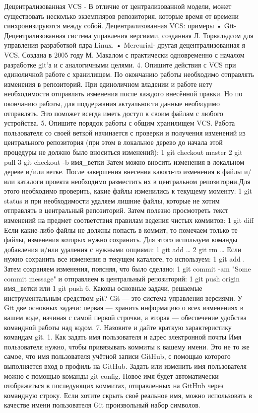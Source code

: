{{{{{{{{{{{{{{{{{{{{Децентрализованная VCS - В отличие от централизованной модели, может существовать несколько экземпляров репозитория, которые время от времени синхронизируются между собой.
Децентрализованная VCS: примеры
• Git- Децентрализованная система управления версиями, созданная Л. Торвальдсом для управления разработкой ядра Linux.
• Mercurial- другая децентрализованная я VCS. Создана в 2005 году М. Макалом с практически одновременно с началом разработке git’а и с аналогичными целями.
4. Опишите действия с VCS при единоличной работе с хранилищем.
По окончанию работы необходимо отправлять изменения в репозиторий. При единоличном владении и работе нету необходимости отправлять изменения после каждого внесённой правки. Но по окончанию работы, для поддержания актуальности данные необходимо отправлять. Это поможет всегда иметь доступ к своим файлам с любого устройства.
5. Опишите порядок работы с общим хранилищем VCS.
Работа пользователя со своей веткой начинается с проверки и получения изменений из центрального репозитория (при этом в локальное дерево до начала этой процедуры не должно было вноситься изменений):
1 git checkout master
2 git pull
3 git checkout -b имя_ветки
Затем можно вносить изменения в локальном дереве и/или ветке.
После завершения внесения какого-то изменения в файлы и/или каталоги проекта необходимо разместить их в центральном репозитории.Для этого необходимо проверить, какие файлы изменились к текущему моменту:
1 git status
и при необходимости удаляем лишние файлы, которые не хотим отправлять в центральный репозиторий.
Затем полезно просмотреть текст изменений на предмет соответствия правилам ведения чистых коммитов:
1 git diff
Если какие-либо файлы не должны попасть в коммит, то помечаем только те файлы, изменения которых нужно сохранить. Для этого используем команды добавления и/или удаления с нужными опциями:
1 git add …
2 git rm …
Если нужно сохранить все изменения в текущем каталоге, то используем:
1 git add .
Затем сохраняем изменения, поясняя, что было сделано:
1 git commit -am "Some commit message"
и отправляем в центральный репозиторий:
1 git push origin имя_ветки
или
1 git push
6. Каковы основные задачи, решаемые инструментальным средством git?
Git — это система управления версиями. У Git две основных задачи: первая — хранить информацию о всех изменениях в вашем коде, начиная с самой первой строчки, а вторая — обеспечение удобства командной работы над кодом.
7. Назовите и дайте краткую характеристику командам git.
1. Как задать имя пользователя и адрес электронной почты
Имя пользователя нужно, чтобы привязывать коммиты к вашему имени. Это не то же самое, что имя пользователя учётной записи GitHub, с помощью которого выполняется вход в профиль на GitHub. Задать или изменить имя пользователя можно с помощью команды git config. Новое имя будет автоматически отображаться в последующих коммитах, отправленных на GitHub через командную строку. Если хотите скрыть своё реальное имя, можно использовать в качестве имени пользователя Git произвольный набор символов.
}}}}}}}}}}}}}}}}}}}}
